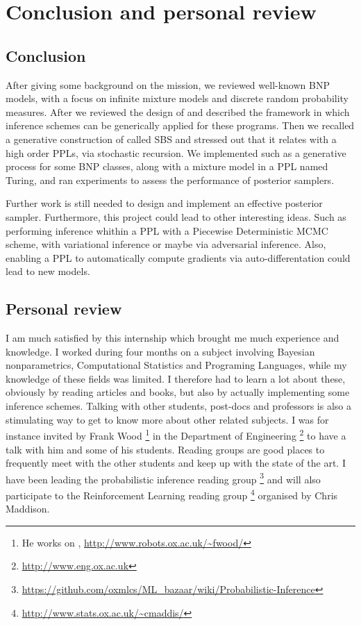 
\chapter{Conclusion and personal review}

\section{Conclusion}
After giving some background on the mission, we reviewed well-known \acrlong{BNP} models, with a focus on infinite mixture models and discrete random probability measures. After we reviewed the design of  and described the framework in which inference schemes can be generically applied for these programs.
Then we recalled a generative construction of  called \acrlong{SBS} and stressed out that it relates with a high order \glspl{PPL}, via stochastic recursion.
We implemented such as a generative process for some \gls{BNP} classes, along with a mixture model in a \gls{PPL} named Turing, and ran experiments to assess the performance of posterior samplers.

Further work is still needed to design and implement an effective posterior sampler.
Furthermore, this project could lead to other interesting ideas. Such as performing inference whithin a \gls{PPL} with a Piecewise Deterministic \gls{MCMC} scheme, with variational inference or maybe via adversarial inference. Also, enabling a \gls{PPL} to automatically compute gradients via auto-differentation could lead to new models.


\section{Personal review}
I am much satisfied by this internship which brought me much experience and knowledge.
I worked during four months on a subject involving Bayesian nonparametrics, Computational Statistics and Programing Languages, while my knowledge of these fields was limited. I therefore had to learn a lot about these, obviously by reading articles and books, but also by actually implementing some inference schemes. Talking with other students, post-docs and professors is also a stimulating way to get to know more about other related subjects. I was for instance invited by Frank Wood \footnote{He works on , \url{http://www.robots.ox.ac.uk/~fwood/}} in the Department of Engineering \footnote{\url{http://www.eng.ox.ac.uk}} to have a talk with him and some of his students. Reading groups are good places to frequently meet with the other students and keep up with the state of the art. I have been leading the probabilistic inference reading group \footnote{\url{https://github.com/oxmlcs/ML_bazaar/wiki/Probabilistic-Inference}} and will also participate to the Reinforcement Learning reading group \footnote{\url{http://www.stats.ox.ac.uk/~cmaddis/}} organised by Chris Maddison.

